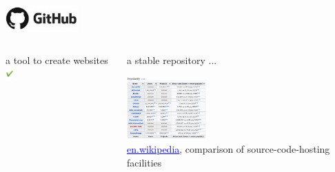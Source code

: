 \begin{frame}[t]{\includegraphics[height=1cm]{shared/logo-github.png}}
\begin{columns}[T]
\begin{block}{a tool to create websites \includegraphics[height=0.3cm]{05_history/Images/FAIR_yes.png}}
\begin{center}
\end{center}
\end{block}
\begin{block}{a stable repository ...}
\begin{center}
\includegraphics[height=2.4cm]{05_history/Images/FAIR_github_popularity.png}\\
{\tiny 
\href{https://en.wikipedia.org/wiki/\\
Comparison_of_source-code-hosting_facilities}{\textcolor{blue}{\underline{en.wikipedia}}}, comparison of source-code-hosting facilities
}
\end{center}
\end{block}
\end{columns}
\end{frame}

